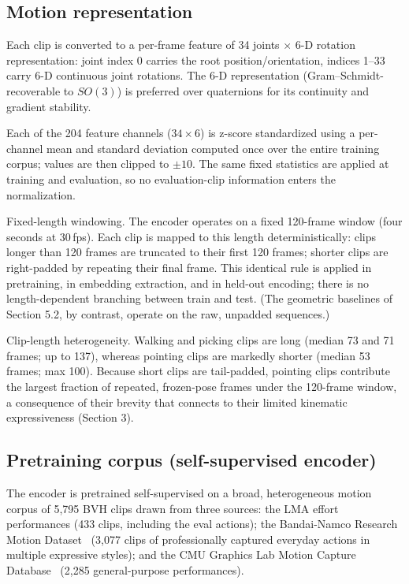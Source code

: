 \documentclass[letterpaper]{article} %
\begin{document}
\subsection{Motion representation}
\label{sec:motionrep}
Each clip is converted to a per-frame feature of {34 joints $\times$ 6-D rotation
representation}: joint index 0 carries the root position/orientation, indices 1--33 carry 6-D
continuous joint rotations. The 6-D representation (Gram--Schmidt-recoverable to $SO(3)$) is
preferred over quaternions for its continuity and gradient stability.

Each of the 204 feature channels ($34 \times 6$) is {z-score standardized} using a
per-channel mean and standard deviation computed once over the entire training corpus; values
are then clipped to $\pm 10$. The same fixed statistics are applied at training and evaluation,
so no evaluation-clip information enters the normalization.

{Fixed-length windowing.} The encoder operates on a fixed {120-frame} window (four
seconds at 30\,fps). Each clip is mapped to this length deterministically: clips longer than 120
frames are truncated to their first 120 frames; shorter clips are {right-padded by
repeating their final frame}. This identical rule is applied in pretraining, in embedding
extraction, and in held-out encoding; there is no length-dependent branching between train and
test. (The geometric baselines of Section 5.2, by contrast, operate on the {raw, unpadded}
sequences.)

{Clip-length heterogeneity.} Walking and picking clips are long (median 73 and 71 frames;
up to 137), whereas pointing clips are markedly shorter (median 53 frames; max 100). Because
short clips are tail-padded, pointing clips contribute the largest fraction of repeated,
frozen-pose frames under the 120-frame window, a consequence of their brevity that connects to
their limited kinematic expressiveness (Section 3).

\subsection{Pretraining corpus (self-supervised encoder)}
\label{sec:corpus}
The encoder is pretrained self-supervised on a broad, heterogeneous motion corpus of
{5{,}795 BVH clips} drawn from three sources: the LMA effort performances (433 clips,
including the eval actions); the Bandai-Namco Research Motion Dataset~\citep{kobayashi2023bandai}
(3{,}077 clips of professionally captured everyday actions in multiple expressive styles); and
the CMU Graphics Lab Motion Capture Database~\citep{cmumocap} (2{,}285 general-purpose performances).
\end{document}
